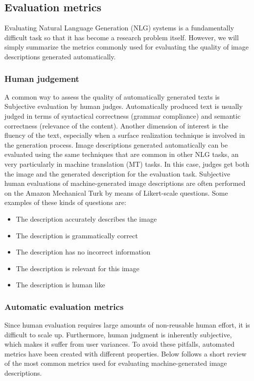 \subsection{Evaluation metrics}\label{subsec:metrics}

Evaluating Natural Language Generation (NLG) systems is a fundamentally difficult task \citep{Reiter2009} so that it has become a research problem itself. However, we will simply summarize the metrics commonly used for evaluating the quality of image descriptions generated automatically.

\subsubsection{Human judgement}

A common way to assess the quality of automatically generated texts is Subjective evaluation by human judges. Automatically produced text is usually judged in terms of syntactical correctness (grammar compliance) and semantic correctness (relevance of the content). Another dimension of interest is the fluency of the text, especially when a surface realization technique is involved in the generation process. Image descriptions generated automatically can be evaluated using the same techniques that are common in other NLG tasks, an very particularly in machine translation (MT) tasks. In this case, judges get both the image and the generated description for the evaluation task. Subjective human evaluations of machine-generated image descriptions are often performed on the Amazon Mechanical Turk by means of Likert-scale questions. Some examples of these kinds of questions are:

\begin{itemize}
\item The description accurately describes the image
\item The description is grammatically correct
\item The description has no incorrect information
\item The description is relevant for this image
\item The description is human like
\end{itemize}

\subsubsection{Automatic evaluation metrics}

Since human evaluation requires large amounts of non-reusable human effort, it is difficult to scale up. Furthermore, human judgment is inherently subjective, which makes it suffer from user variances. To avoid these pitfalls, automated metrics have been created with different properties. Below follows a short review of the most common metrics used for evaluating machine-generated image descriptions.

